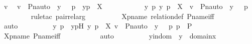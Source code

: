\begin{isabellebody}
\ v\ \isamarkupfalse%
\ {\isachardoublequoteopen}v\ {\isasymin}\ {\isacharbraceleft}{\kern0pt}{\isasymlangle}Pn{\isacharunderscore}{\kern0pt}auto{\isacharparenleft}{\kern0pt}{\isasympi}{\isacharparenright}{\kern0pt}\ {\isacharbackquote}{\kern0pt}\ y{\isacharcomma}{\kern0pt}\ {\isasympi}\ {\isacharbackquote}{\kern0pt}\ p{\isasymrangle}\ {\isachardot}{\kern0pt}\ {\isasymlangle}y{\isacharcomma}{\kern0pt}p{\isasymrangle}\ {\isasymin}\ X{\isacharbraceright}{\kern0pt}{\isachardoublequoteclose}\ \ \isanewline
\ \ \ \ \ \ \isamarkupfalse%
\ \isamarkupfalse%
\ {\isachardoublequoteopen}{\isasymexists}y\ p{\isachardot}{\kern0pt}\ {\isacharless}{\kern0pt}y{\isacharcomma}{\kern0pt}\ p{\isachargreater}{\kern0pt}\ {\isasymin}\ X\ {\isasymand}\ v\ {\isacharequal}{\kern0pt}\ {\isasymlangle}Pn{\isacharunderscore}{\kern0pt}auto{\isacharparenleft}{\kern0pt}{\isasympi}{\isacharparenright}{\kern0pt}\ {\isacharbackquote}{\kern0pt}\ y{\isacharcomma}{\kern0pt}\ {\isasympi}\ {\isacharbackquote}{\kern0pt}\ p{\isasymrangle}{\isachardoublequoteclose}\ \isanewline
\ \ \ \ \ \ \ \ \isamarkupfalse%
{\isacharparenleft}{\kern0pt}rule{\isacharunderscore}{\kern0pt}tac\ pair{\isacharunderscore}{\kern0pt}rel{\isacharunderscore}{\kern0pt}arg{\isacharparenright}{\kern0pt}\isanewline
\ \ \ \ \ \ \ \ \isamarkupfalse%
\ Xpname\ relation{\isacharunderscore}{\kern0pt}def\ P{\isacharunderscore}{\kern0pt}name{\isacharunderscore}{\kern0pt}iff\isanewline
\ \ \ \ \ \ \ \ \isamarkupfalse%
\ auto\isanewline
\ \ \ \ \ \ \isamarkupfalse%
\ \isamarkupfalse%
\ y\ p\ \ ypH{\isacharcolon}{\kern0pt}\ {\isachardoublequoteopen}{\isacharless}{\kern0pt}y{\isacharcomma}{\kern0pt}\ p{\isachargreater}{\kern0pt}\ {\isasymin}\ X{\isachardoublequoteclose}\ {\isachardoublequoteopen}v\ {\isacharequal}{\kern0pt}\ {\isasymlangle}Pn{\isacharunderscore}{\kern0pt}auto{\isacharparenleft}{\kern0pt}{\isasympi}{\isacharparenright}{\kern0pt}\ {\isacharbackquote}{\kern0pt}\ y{\isacharcomma}{\kern0pt}\ {\isasympi}\ {\isacharbackquote}{\kern0pt}\ p{\isasymrangle}{\isachardoublequoteclose}\ {\isachardoublequoteopen}p\ {\isasymin}\ P{\isachardoublequoteclose}\isanewline
\ \ \ \ \ \ \ \ \isamarkupfalse%
\ Xpname\ P{\isacharunderscore}{\kern0pt}name{\isacharunderscore}{\kern0pt}iff\ \isanewline
\ \ \ \ \ \ \ \ \isamarkupfalse%
\ auto\isanewline
\ \ \ \ \ \ \isamarkupfalse%
\ \isamarkupfalse%
\ yindom\ {\isacharcolon}{\kern0pt}\ {\isachardoublequoteopen}y\ {\isasymin}\ domain{\isacharparenleft}{\kern0pt}x{\isacharparenright}{\kern0pt}{\isachardoublequoteclose}\ \isamarkupfalse%

\end{isabellebody}
